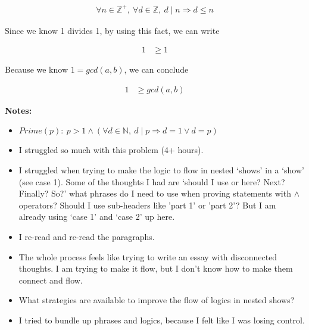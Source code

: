\documentclass[12pt]{article}
\begin{document}
\begin{enumerate}[a.]
\begin{mdframed}
\begin{enumerate}[1.]
\begin{mdframed}
            \begin{align}
                \forall n \in \mathbb{Z}^{+},\:\forall d \in \mathbb{Z},\:d \mid n \Rightarrow d \leq n
            \end{align}

            Since we know 1 divides 1, by using this fact, we can write

            \begin{align}
                1 &\geq 1
            \end{align}

            Because we know $1 = gcd(a,b)$, we can conclude

            \begin{align}
                1 &\geq gcd(a,b)
            \end{align}

            \end{mdframed}

        \end{enumerate}

    \end{mdframed}

    \bigskip

    \textbf{Notes:}

    \begin{itemize}
        \item $Prime(p):\:p > 1 \land (\forall d \in \mathbb{N},\:d \mid p \Rightarrow d = 1 \lor d = p)$
        \item I struggled so much with this problem (4+ hours).
        \item I struggled when trying to make the logic to flow in nested `shows' in a `show' (see case 1).
        Some of the thoughts I had are `should I use or here? Next? Finally? So?' what phrases do I need
        to use when proving statements with $\land$ operators? Should I use sub-headers like 'part 1' or 'part 2'?
        But I am already using `case 1' and `case 2' up here.
        \item I re-read and re-read the paragraphs.
        \item The whole process feels like trying to write an essay with disconnected thoughts.
        I am trying to make it flow, but I don't know how to make them connect and flow.
        \item What strategies are available to improve the flow of logics in nested shows?
        \item I tried to bundle up phrases and logics, because I felt like I
        was losing control.
    \end{itemize}
\end{enumerate}
\end{document}
